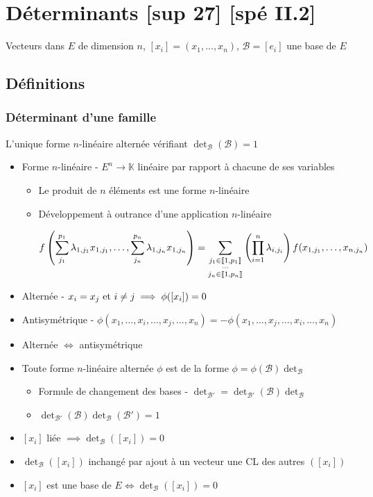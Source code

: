 \documentclass[openany]{book}
\begin{document}
\clearpage

\section{Déterminants [sup 27] [spé II.2]}
Vecteurs dans $E$ de dimension $n$, $[x_i] = (x_1,...,x_n)$, $\mathcal{B} = [e_i]$ une base de $E$

\subsection{Définitions}
\subsubsection{Déterminant d'une famille}

L'unique forme $n$-linéaire alternée vérifiant $\det_{\mathcal{B}}(\mathcal{B}) = 1$

\begin{itemize}
    \item Forme $n$-linéaire - $E^n \rightarrow \mathbb{K}$ linéaire par rapport à chacune de ses variables
    \begin{itemize}
        \item Le produit de $n$ éléments est une forme $n$-linéaire
        \item Développement à outrance d'une application $n$-linéaire

        \[ f \left( \sum_{j_1}^{p_1} \lambda_{1, j_1} x_{1, j_1}, \dots, \sum_{j_n}^{p_n} \lambda_{1, j_n} x_{1, j_n} \right) = \sum_{\substack{j_1 \in \llbracket {1}, {p_1} \rrbracket \\ \dots \\[2pt] j_n \in \llbracket {1}, {p_n} \rrbracket}} \left( \prod_{i=1}^n \lambda_{i,j_i} \right) f(x_{1, j_1}, \dots, x_{n, j_n}) \]
    \end{itemize}
    \item Alternée - $ x_i = x_j \text{ et } i \neq j \implies \phi([x_i]) = 0 $
    \item Antisymétrique - $\phi (x_1,\dots,x_i,\dots,x_j,\dots,x_n) = -\phi (x_1,\dots,x_j,\dots,x_i,\dots,x_n)$
    \item Alternée $\iff$ antisymétrique
    \item Toute forme $n$-linéaire alternée $\phi$ est de la forme $\phi = \phi(\mathcal{B})\det_{\mathcal{B}}$
    \begin{itemize}
        \item Formule de changement des bases - $\det_{\mathcal{B}'} = \det_{\mathcal{B'}}(\mathcal{B}) \det_{\mathcal{B}}$
        \item $ \det_{\mathcal{B'}}(\mathcal{B}) \det_{\mathcal{B}}(\mathcal{B'}) = 1$
    \end{itemize}
    \item $[x_i]$ liée $\implies \det_{\mathcal{B}}([x_i]) = 0$
    \item $\det_{\mathcal{B}}([x_i])$ inchangé par ajout à un vecteur une CL des autres $([x_i])$
    \item $[x_i]$ est une base de $E \iff \det_{\mathcal{B}}([x_i]) = 0$
\end{itemize}
\end{document}
